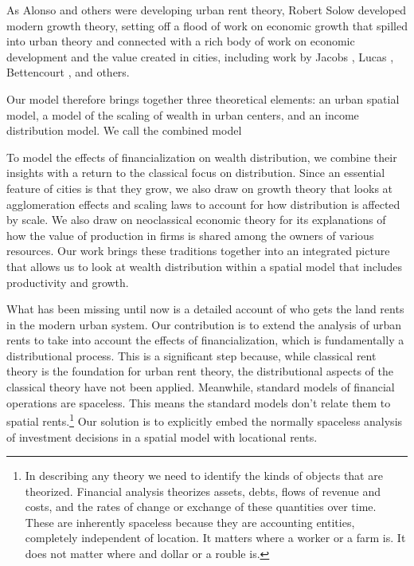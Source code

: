As Alonso and others were developing urban rent theory, Robert Solow \cite{solowContributionTheoryEconomic1956} developed modern growth theory, setting off a flood of work on economic growth that spilled into urban theory and connected with a rich body of work on economic development and the value created in cities, including work by Jacobs \cite{jacobsEconomyCities1969}, Lucas \cite{lucasMechanicsEconomicDevelopment1988}, Bettencourt \cite{bettencourtGrowthInnovationScaling2007}, and others. 


Our model therefore brings together three theoretical elements: an urban spatial model,  a model of the scaling of wealth in urban centers, and an income distribution model. %
We call the combined model 

To model the effects of financialization on wealth distribution, we combine their insights with a return to the classical focus on distribution.  Since an essential feature of cities is that they grow, we also draw on growth theory that looks at agglomeration effects and scaling laws to account for how distribution is affected by scale.  We also draw on neoclassical economic theory for its explanations of how the value of production in firms is shared among the owners of various resources.  Our work brings these traditions together into an integrated picture that allows us to look at wealth distribution within a spatial model that includes productivity and growth. 

What has been missing until now is a detailed account of who gets the land rents in the modern urban system. Our contribution is to extend the analysis of urban rents to take into account the effects of financialization, which is fundamentally a distributional process. This is a significant step because, while classical rent theory is the foundation for urban rent theory, the distributional aspects of the classical theory have not been applied. Meanwhile, standard models of financial operations are spaceless. This means the standard models don't relate them to spatial rents.\footnote{In describing any theory we need to identify the kinds of objects that are theorized. Financial analysis theorizes assets, debts, flows of revenue and costs, and the rates of change or exchange of these quantities over time. These are inherently spaceless because they are accounting entities, completely independent of location. It matters where a worker or a farm is. It does not matter where and dollar or a rouble is.} Our solution is to explicitly embed the normally spaceless analysis of investment decisions in a spatial model with locational rents.

